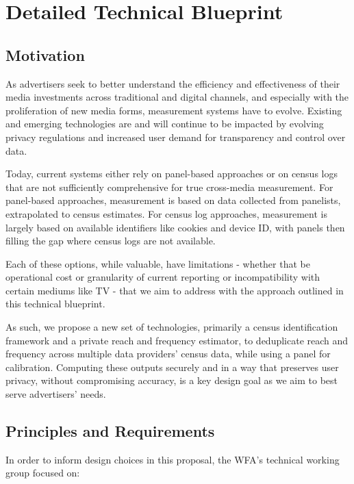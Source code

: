 \documentclass[]{article}
\begin{document}

\section{Detailed Technical Blueprint}

\subsection{Motivation}

As advertisers seek to better understand the efficiency and effectiveness of their media investments across traditional and digital channels, and especially with the proliferation of new media forms, measurement systems have to evolve. Existing and emerging technologies are and will continue to be impacted by evolving privacy regulations and increased user demand for transparency and control over data.

Today, current systems either rely on panel-based approaches or on census logs that are not sufficiently comprehensive for true cross-media measurement. For panel-based approaches, measurement is based on data collected from panelists, extrapolated to census estimates. For census log approaches, measurement is largely based on available identifiers
like cookies and device ID, with panels then filling the gap where census logs are not available.

Each of these options, while valuable, have limitations - whether that be operational cost or granularity of current reporting or incompatibility with certain mediums like TV - that we aim to address with the approach outlined in this technical blueprint.

As such, we propose a new set of technologies, primarily a census identification framework and a private reach and frequency estimator, to deduplicate reach and frequency across multiple data providers' census data, while using a panel for calibration. Computing these outputs securely and in a way that preserves user privacy, without compromising accuracy, is a key design goal as we aim to best serve advertisers' needs.


\subsection{Principles and Requirements}

In order to inform design choices in this proposal, the WFA's technical
working group focused on:
\end{document}
